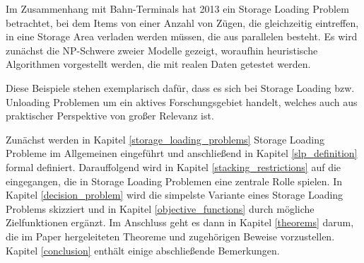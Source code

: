 Im Zusammenhang mit Bahn-Terminals hat \textcite{Jaehn2013} 2013 ein Storage Loading Problem betrachtet,
bei dem Items von einer Anzahl von Zügen, die gleichzeitig eintreffen, in eine Storage Area
verladen werden müssen, die aus parallelen  besteht.
Es wird zunächst die NP-Schwere zweier Modelle gezeigt, woraufhin heuristische Algorithmen vorgestellt werden,
die mit realen Daten getestet werden.

Diese Beispiele stehen exemplarisch dafür, dass es sich bei Storage Loading bzw. Unloading Problemen um
ein aktives Forschungsgebiet handelt, welches auch aus praktischer Perspektive von großer Relevanz ist.

Zunächst werden in Kapitel \ref{storage_loading_problems} Storage Loading Probleme im Allgemeinen eingeführt und anschließend
in Kapitel \ref{slp_definition} formal definiert. Da­r­auf­fol­gend wird in Kapitel \ref{stacking_restrictions} auf die  eingegangen,
die in Storage Loading Problemen eine zentrale Rolle spielen. In Kapitel \ref{decision_problem} wird die simpelste Variante eines Storage Loading Problems
skizziert und in Kapitel \ref{objective_functions} durch mögliche Zielfunktionen ergänzt. Im Anschluss geht es dann in Kapitel \ref{theorems} darum,
die im Paper hergeleiteten Theoreme und zugehörigen Beweise vorzustellen. Kapitel \ref{conclusion} enthält einige abschließende Bemerkungen.

\pagebreak

